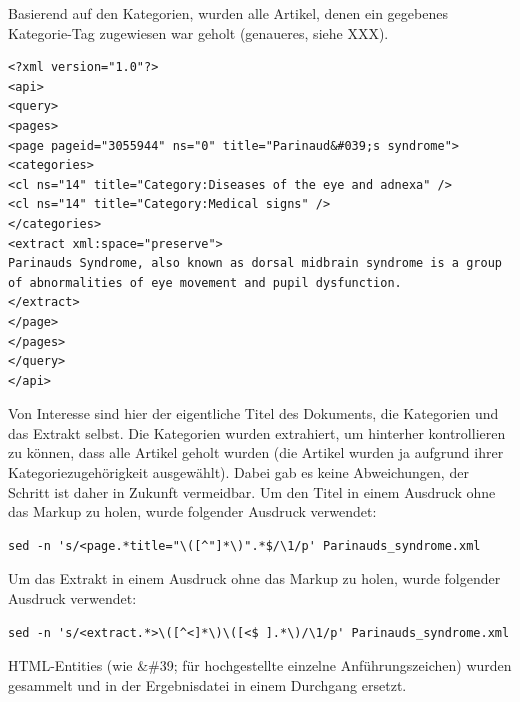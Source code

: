 \documentclass[pagesize,DIV=calc,12pt,draft]{scrreprt}
\begin{document}
Basierend auf den Kategorien, wurden alle Artikel, denen ein gegebenes
Kategorie-Tag zugewiesen war geholt (genaueres, siehe XXX).

\lstset{
language=XML
}

\begin{lstlisting}
<?xml version="1.0"?>
<api>
<query>
<pages>
<page pageid="3055944" ns="0" title="Parinaud&#039;s syndrome">
<categories>
<cl ns="14" title="Category:Diseases of the eye and adnexa" />
<cl ns="14" title="Category:Medical signs" />
</categories>
<extract xml:space="preserve">
Parinauds Syndrome, also known as dorsal midbrain syndrome is a group of abnormalities of eye movement and pupil dysfunction.
</extract>
</page>
</pages>
</query>
</api>
\end{lstlisting}

Von Interesse sind hier der eigentliche Titel des Dokuments, die
Kategorien und das Extrakt selbst. Die Kategorien wurden extrahiert, um
hinterher kontrollieren zu können, dass alle Artikel geholt wurden (die
Artikel wurden ja aufgrund ihrer Kategoriezugehörigkeit ausgewählt).
Dabei gab es keine Abweichungen, der Schritt ist daher in Zukunft
vermeidbar. Um den Titel in einem Ausdruck ohne das Markup zu holen, wurde folgender
Ausdruck verwendet:

\lstset{
language=bash
}

\begin{lstlisting}
sed -n 's/<page.*title="\([^"]*\)".*$/\1/p' Parinauds_syndrome.xml
\end{lstlisting}

Um das Extrakt in einem Ausdruck ohne das Markup zu holen, wurde
folgender Ausdruck verwendet:

\begin{lstlisting}
sed -n 's/<extract.*>\([^<]*\)\([<$ ].*\)/\1/p' Parinauds_syndrome.xml
\end{lstlisting}

HTML-Entities (wie \&\#39; für hochgestellte einzelne Anführungszeichen) wurden gesammelt und in der Ergebnisdatei in einem Durchgang ersetzt.
\end{document}
